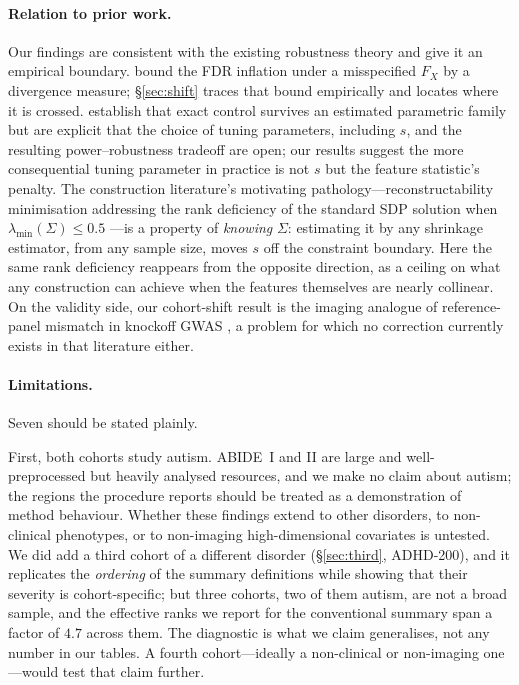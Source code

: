 \documentclass[11pt,a4paper]{article}
\newcommand{\ld}{\lambda_{\min}}
\begin{document}
\paragraph{Relation to prior work.}
Our findings are consistent with the existing robustness theory and give it
an empirical boundary. \citet{barber2020robust} bound the FDR inflation
under a misspecified $F_X$ by a divergence measure; \S\ref{sec:shift}
traces that bound empirically and locates where it is crossed.
\citet{huang2020relaxing} establish that exact control survives an
estimated parametric family but are explicit that the choice of tuning
parameters, including $s$, and the resulting power--robustness tradeoff are
open; our results suggest the more consequential tuning parameter in
practice is not $s$ but the feature statistic's penalty. The construction
literature's motivating pathology---reconstructability minimisation
addressing the rank deficiency of the standard SDP solution when
$\ld(\Sigma)\le0.5$ \citep{spector2022powerful}---is a property of
\emph{knowing} $\Sigma$: estimating it by any shrinkage estimator, from any
sample size, moves $s$ off the constraint boundary. Here the same rank
deficiency reappears from the opposite direction, as a ceiling on what any
construction can achieve when the features themselves are nearly collinear.
On the validity side, our cohort-shift result is the imaging analogue of
reference-panel mismatch in knockoff GWAS
\citep{chen2021ldref,kanai2022slalom}, a problem for which no correction
currently exists in that literature either.

\paragraph{Limitations.}
Seven should be stated plainly.

First, both cohorts study autism. ABIDE~I and II are large and
well-preprocessed but heavily analysed resources, and we make no claim about
autism; the regions the procedure reports should be treated as a
demonstration of method behaviour. Whether these findings extend to other
disorders, to non-clinical phenotypes, or to non-imaging high-dimensional
covariates is untested. We did add a third cohort of a different disorder
(\S\ref{sec:third}, ADHD-200), and it replicates the \emph{ordering} of the
summary definitions while showing that their severity is cohort-specific;
but three cohorts, two of them autism, are not a broad sample, and the
effective ranks we report for the conventional summary span a factor of $4.7$
across them. The diagnostic is what we claim generalises, not any number in
our tables. A fourth cohort---ideally a non-clinical or non-imaging one---would
test that claim further.
\end{document}
